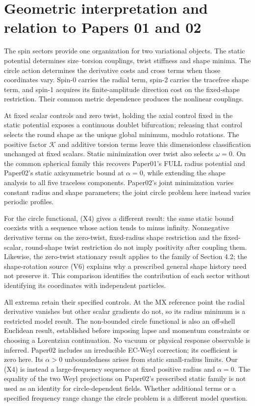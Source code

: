 \section{Geometric interpretation and relation to Papers 01 and 02}

\label{sec:7}

The spin sectors provide one organization for two variational objects. The static potential determines size--torsion couplings, twist stiffness and shape minima. The circle action determines the derivative costs and cross terms when those coordinates vary. Spin-0 carries the radial term, spin-2 carries the tracefree shape term, and spin-1 acquires its finite-amplitude direction cost on the fixed-shape restriction. Their common metric dependence produces the nonlinear couplings.

At fixed scalar controls and zero twist, holding the axial control fixed in the static potential exposes a continuous doublet bifurcation; releasing that control selects the round shape as the unique global minimum, modulo rotations. The positive factor $\mathcal K$ and additive torsion terms leave this dimensionless classification unchanged at fixed scalars. Static minimization over twist also selects $\omega=0$. On the common spherical family this recovers Paper01's FULL radius potential and Paper02's static axisymmetric bound at $\alpha=0$, while extending the shape analysis to all five traceless components. Paper02's joint minimization varies constant radius and shape parameters; the joint circle problem here instead varies periodic profiles.

For the circle functional, (X4) gives a different result: the same static bound coexists with a sequence whose action tends to minus infinity. Nonnegative derivative terms on the zero-twist, fixed-radius shape restriction and the fixed-scalar, round-shape twist restriction do not imply positivity after coupling them. Likewise, the zero-twist stationary result applies to the family of Section 4.2; the shape-rotation source (V6) explains why a prescribed general shape history need not preserve it. This comparison identifies the contribution of each sector without identifying its coordinates with independent particles.

All extrema retain their specified controls. At the MX reference point the radial derivative vanishes but other scalar gradients do not, so its radius minimum is a restricted model result. The non-bounded circle functional is also an off-shell Euclidean result, established before imposing lapse and momentum constraints or choosing a Lorentzian continuation. No vacuum or physical response observable is inferred. Paper02 includes an irreducible EC-Weyl correction; its coefficient is zero here. Its $\alpha>0$ unboundedness arises from static small-radius limits. Our (X4) is instead a large-frequency sequence at fixed positive radius and $\alpha=0$. The equality of the two Weyl projections on Paper02's prescribed static family is not used as an identity for circle-dependent fields. Whether additional terms or a specified frequency range change the circle problem is a different model question.
